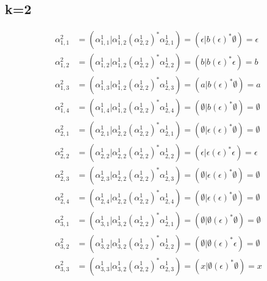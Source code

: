 \documentclass{article}
\begin{document}
\subsection*{k=2}
\begin{align*}
\alpha^2_{1,1} &= \left(\alpha^1_{1,1}|\alpha^1_{1,2}\left(\alpha^1_{2,2}\right)^*\alpha^1_{2,1}\right) = \left(\epsilon|b\left(\epsilon\right)^*\emptyset\right) = \epsilon \\
\alpha^2_{1,2} &= \left(\alpha^1_{1,2}|\alpha^1_{1,2}\left(\alpha^1_{2,2}\right)^*\alpha^1_{2,2}\right) = \left(b|b\left(\epsilon\right)^*\epsilon\right) = b \\
\alpha^2_{1,3} &= \left(\alpha^1_{1,3}|\alpha^1_{1,2}\left(\alpha^1_{2,2}\right)^*\alpha^1_{2,3}\right) = \left(a|b\left(\epsilon\right)^*\emptyset\right) = a \\
\alpha^2_{1,4} &= \left(\alpha^1_{1,4}|\alpha^1_{1,2}\left(\alpha^1_{2,2}\right)^*\alpha^1_{2,4}\right) = \left(\emptyset|b\left(\epsilon\right)^*\emptyset\right) = \emptyset \\
\alpha^2_{2,1} &= \left(\alpha^1_{2,1}|\alpha^1_{2,2}\left(\alpha^1_{2,2}\right)^*\alpha^1_{2,1}\right) = \left(\emptyset|\epsilon\left(\epsilon\right)^*\emptyset\right) = \emptyset \\
\alpha^2_{2,2} &= \left(\alpha^1_{2,2}|\alpha^1_{2,2}\left(\alpha^1_{2,2}\right)^*\alpha^1_{2,2}\right) = \left(\epsilon|\epsilon\left(\epsilon\right)^*\epsilon\right) = \epsilon \\
\alpha^2_{2,3} &= \left(\alpha^1_{2,3}|\alpha^1_{2,2}\left(\alpha^1_{2,2}\right)^*\alpha^1_{2,3}\right) = \left(\emptyset|\epsilon\left(\epsilon\right)^*\emptyset\right) = \emptyset \\
\alpha^2_{2,4} &= \left(\alpha^1_{2,4}|\alpha^1_{2,2}\left(\alpha^1_{2,2}\right)^*\alpha^1_{2,4}\right) = \left(\emptyset|\epsilon\left(\epsilon\right)^*\emptyset\right) = \emptyset \\
\alpha^2_{3,1} &= \left(\alpha^1_{3,1}|\alpha^1_{3,2}\left(\alpha^1_{2,2}\right)^*\alpha^1_{2,1}\right) = \left(\emptyset|\emptyset\left(\epsilon\right)^*\emptyset\right) = \emptyset \\
\alpha^2_{3,2} &= \left(\alpha^1_{3,2}|\alpha^1_{3,2}\left(\alpha^1_{2,2}\right)^*\alpha^1_{2,2}\right) = \left(\emptyset|\emptyset\left(\epsilon\right)^*\epsilon\right) = \emptyset \\
\alpha^2_{3,3} &= \left(\alpha^1_{3,3}|\alpha^1_{3,2}\left(\alpha^1_{2,2}\right)^*\alpha^1_{2,3}\right) = \left(x|\emptyset\left(\epsilon\right)^*\emptyset\right) = x \\

\end{align*}
\end{document}
